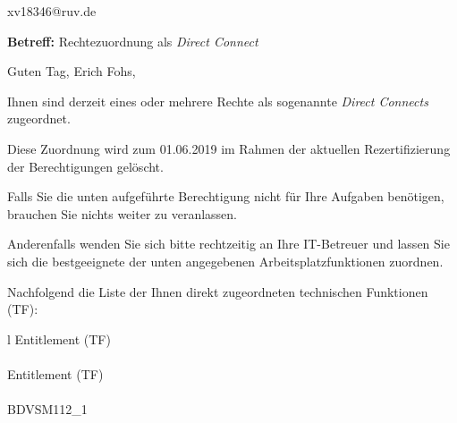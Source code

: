 \documentclass[a4paper,landscape,12pt]{letter}
\begin{document}
\begin{letter}{xv18346@ruv.de\hfill \break}
\begin{normalsize}
	\opening{\textbf{Betreff:} Rechtezuordnung als \emph{Direct Connect}}
	\begin{normalsize} \hfill
	\end{normalsize}

	\begin{normalsize}
		Guten Tag, 
	Erich Fohs, \hfill \break
	\end{normalsize}
	\end{normalsize}
	
\begin{normalsize}
	Ihnen sind derzeit eines oder mehrere Rechte als sogenannte \emph{Direct Connects} zugeordnet.
	
	Diese Zuordnung wird zum 01.06.2019 im Rahmen der aktuellen Rezertifizierung der Berechtigungen gelöscht.
	
	Falls Sie die unten aufgeführte Berechtigung nicht für Ihre Aufgaben benötigen, 
	brauchen Sie nichts weiter zu veranlassen.
	
	Anderenfalls wenden Sie sich bitte rechtzeitig an Ihre IT-Betreuer 
	und lassen Sie sich die bestgeeignete der unten angegebenen Arbeitsplatzfunktionen zuordnen.
	\end{normalsize}
	
\begin{normalsize}
	Nachfolgend die Liste der Ihnen direkt zugeordneten technischen Funktionen (TF):

	\begin{longtable}{l}
		Entitlement (TF) \\ \hline
		\endfirsthead
		\\\hline
		Entitlement (TF) \\ \hline
		\endhead %
		\multicolumn{1}{r@{}}{Fortsetzung \ldots}\\
		\endfoot
		\hline
		\endlastfoot
	BDVSM112\_1\\
	\end{longtable}
	\end{normalsize}
	

\end{letter}
\end{document}
